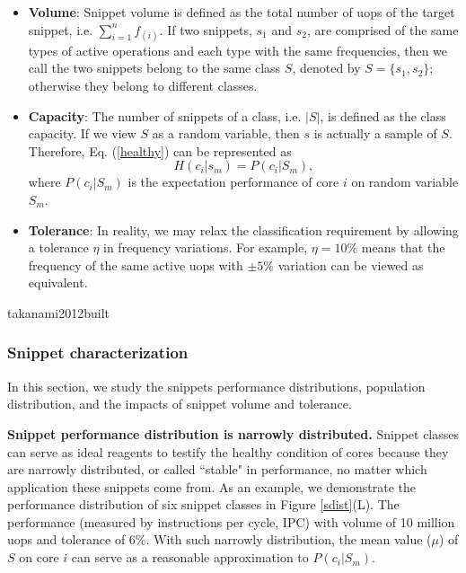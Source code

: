 \begin{itemize}
    \item \textbf{Volume}: Snippet volume is defined as the total number of uops of the target snippet, i.e. $\sum_{i=1}^n f_{(i)} $. If two snippets, $s_1$ and $s_2$, are comprised of the same types of active operations and each type with the same frequencies, then we call the two snippets  belong to the same class $S$, denoted by $S=\{s_1, s_2\}$; otherwise they belong to different classes.

    \item \textbf{Capacity}: The number of snippets of a class, i.e. $|S|$, is defined as the class capacity. If we view $S$ as a random variable, then $s$ is actually a sample of $S$. Therefore, Eq. (\ref{healthy}) can be represented as
        \begin{equation}
            H(c_i|s_m)=P(c_i|S_m), \label{healthy2}
        \end{equation}
        where  $P(c_i|S_m)$ is the expectation performance of core $i$ on random variable $S_m$.

    \item \textbf{Tolerance}: In reality, we may relax the classification requirement by allowing a tolerance $\eta$ in frequency variations.  For example, $\eta=10\%$ means that the frequency of the same active uops with $\pm5\%$ variation can be viewed as equivalent.
\end{itemize}

takanami2012built\subsubsection{Snippet characterization}
In this section, we study the snippets performance distributions, population distribution, and the impacts of snippet volume and tolerance. 

\textbf{Snippet performance distribution is narrowly distributed.} Snippet classes can serve as ideal reagents to testify the healthy condition of cores because they are narrowly distributed, or called ``stable" in performance, no matter which application these snippets come from. As an example, we demonstrate the performance distribution of six snippet classes in Figure \ref{sdist}(L). The performance (measured by instructions per cycle, IPC) with volume of 10 million uops and tolerance of 6\%.   With such narrowly distribution, the mean value ($\mu$) of  $S$  on core $i$ can serve as a reasonable approximation to $P(c_i|S_m)$.

